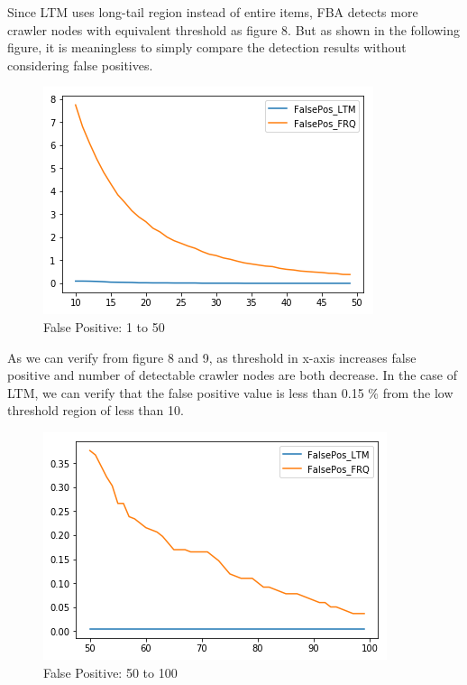 \documentclass[sigconf,anonymous=true]{acmart}
\begin{document}
\begin{enumerate}
Since LTM uses long-tail region instead of entire items, FBA detects more crawler nodes with equivalent threshold as figure 8. But as shown in the following figure, it is meaningless to simply compare the detection results without considering false positives.

\begin{figure}[H]
    \centering
    \includegraphics[width=0.85\columnwidth]{figs/figure_fp_compare_01.png}
    \caption{False Positive: 1 to 50}
    \label{fig:my_label}
\end{figure}

As we can verify from figure 8 and 9, as threshold in x-axis increases false positive and number of detectable crawler nodes are both decrease. In the case of LTM, we can verify that the false positive value is less than 0.15 \% from the low threshold region of less than 10.

\begin{figure}[H]
    \centering
    \includegraphics[width=0.85\columnwidth]{figs/figure_fp_compare_02.png}
    \caption{False Positive: 50 to 100}
    \label{fig:my_label}
\end{figure}


\end{enumerate}
\end{document}

